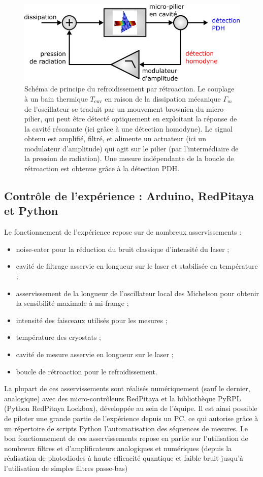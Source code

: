 \documentclass[12pt,a4paper]{article}
\begin{document}
\begin{figure}
\center
\includegraphics[scale=0.5]{figures/feedback_cooling.png}
\caption{Schéma de principe du refroidissement par rétroaction.
Le couplage à un bain thermique $T_\mathrm{env}$ en raison de la dissipation mécanique $\Gamma_m$ de l'oscillateur se traduit par un mouvement brownien du micro-pilier, qui peut être détecté optiquement en exploitant la réponse de la cavité résonante (ici grâce à une détection homodyne).
Le signal obtenu est amplifié, filtré, et alimente un actuateur (ici un modulateur d'amplitude) qui agit sur le pilier (par l'intermédiaire de la pression de radiation).
Une mesure indépendante de la boucle de rétroaction est obtenue grâce à la détection PDH.}
\label{fig:feedback_scheme}
\end{figure}

\subsection{Contrôle de l'expérience : Arduino, RedPitaya et Python}

Le fonctionnement de l'expérience repose sur de nombreux asservissements :
\begin{itemize}
\item noise-eater pour la réduction du bruit classique d'intensité du laser ;
\item cavité de filtrage asservie en longueur sur le laser et stabilisée en température ;
\item asservissement de la longueur de l'oscillateur local des Michelson pour obtenir la sensibilité maximale à mi-frange ;
\item intensité des faisceaux utilisés pour les mesures ;
\item température des cryostats ;
\item cavité de mesure asservie en longueur sur le laser ;
\item boucle de rétroaction pour le refroidissement.
\end{itemize}
La plupart de ces asservissements sont réalisés numériquement (sauf le dernier, analogique) avec des micro-contrôleurs RedPitaya et la bibliothèque PyRPL (Python RedPitaya Lockbox), développée au sein de l'équipe.
Il est ainsi possible de piloter une grande partie de l'expérience depuis un PC, ce qui autorise grâce à un répertoire de scripts Python l'automatisation des séquences de mesures.
Le bon fonctionnement de ces asservissements repose en partie sur l'utilisation de nombreux filtres et d'amplificateurs analogiques et numériques (depuis la réalisation de photodiodes à haute efficacité quantique et faible bruit jusqu'à l'utilisation de simples filtres passe-bas)
\end{document}
